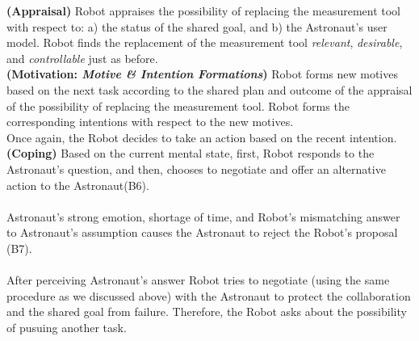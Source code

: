 \noindent\textbf{(Appraisal)} Robot appraises the possibility of
replacing the measurement tool with respect to: a) the status of the shared
goal, and b) the Astronaut's user model. Robot finds the replacement of the
measurement tool \textit{relevant}, \textit{desirable}, and
\textit{controllable} just as before.\\

\noindent\textbf{(Motivation: \textit{Motive \& Intention Formations})} Robot
forms new motives based on the next task according to the shared plan and
outcome of the appraisal of the possibility of replacing the measurement tool.
Robot forms the corresponding intentions with respect to the new motives.\\

Once again, the Robot decides to take an action based on the recent intention.\\

\noindent\textbf{(Coping)} Based on the current mental state, first, Robot
responds to the Astronaut's question, and then, chooses to negotiate and offer
an alternative action to the Astronaut(B6).\\

\noindent{}\\

Astronaut's strong emotion, shortage of time, and Robot's mismatching answer to
Astronaut's assumption causes the Astronaut to reject the Robot's proposal
(B7).\\

\noindent{}\\

After perceiving Astronaut's answer Robot tries to negotiate (using the same
procedure as we discussed above) with the Astronaut to protect the collaboration
and the shared goal from failure. Therefore, the Robot asks about the
possibility of pusuing another task.\\

\noindent{}\\

